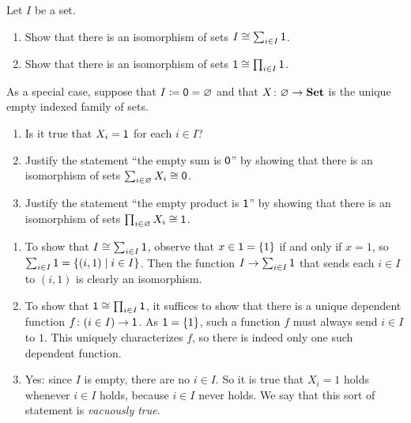 \documentclass[Book-Poly]{subfiles}
\begin{document}
\begin{exercise}\label{exc.on_sums_prods_sets}
    Let $I$ be a set.
    \begin{enumerate}
        \item \label{exc.on_sums_prods_sets.sum} Show that there is an isomorphism of sets $I\cong\sum_{i\in I}\textsf{1}$.
        \item \label{exc.on_sums_prods_sets.prod} Show that there is an isomorphism of sets $\textsf{1}\cong\prod_{i\in I}\textsf{1}$.
    \end{enumerate}
    As a special case, suppose that $I\coloneqq\textsf{0}=\varnothing$ and that $X\colon \varnothing\to\mathbf{Set}$ is the unique empty indexed family of sets.
    \begin{enumerate}[resume]
        \item Is it true that $X_i=\textsf{1}$ for each $i\in I$?
        \item Justify the statement ``the empty sum is $\textsf{0}$'' by showing that there is an isomorphism of sets $\sum_{i\in\varnothing}X_i\cong\textsf{0}$.
        \item Justify the statement ``the empty product is $\textsf{1}$'' by showing that there is an isomorphism of sets $\prod_{i\in\varnothing}X_i\cong\textsf{1}$.
        \qedhere
    \end{enumerate}

    \begin{solution}
        \begin{enumerate}
            \item \label{sol.on_sums_prods_sets.sum}
            To show that $I\cong\sum_{i \in I}\textsf{1}$, observe that $x \in \textsf{1} = \{1\}$ if and only if $x = 1$, so $\sum_{i \in I} \textsf{1} = \{(i, 1) \mid i \in I\}$.
            Then the function $I \to \sum_{i \in I} \textsf{1}$ that sends each $i \in I$ to $(i, 1)$ is clearly an isomorphism.

            \item \label{sol.on_sums_prods_sets.prod}
            To show that $\textsf{1} \cong \prod_{i \in I} \textsf{1}$, it suffices to show that there is a unique dependent function $f \colon (i \in I) \to \textsf{1}$.
            As $\textsf{1} = \{1\}$, such a function $f$ must always send $i \in I$ to $1$.
            This uniquely characterizes $f$, so there is indeed only one such dependent function.

            \item \label{sol.on_sums_prods_sets.vac} Yes: since $I$ is empty, there are no $i \in I$.
            So it is true that $X_i = 1$ holds whenever $i \in I$ holds, because $i \in I$ never holds.
            We say that this sort of statement is \emph{vacuously true}.


\end{enumerate}
\end{solution}
\end{exercise}
\end{document}
